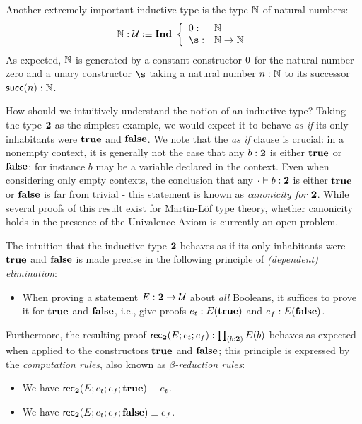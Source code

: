 Another extremely important inductive type is the type $\mathbb{N}$ of natural numbers:  
\[  \nat : \type \defeq \myInd \left\{ 
\begin{array}{ll}
\z : & \nat \\
\s : & \nat \to \nat
\end{array}
\right. \]
As expected, $\mathbb{N}$ is generated by a constant constructor $0$ for the natural number zero and a unary constructor $\s$ taking a natural number $n : \mathbb{N}$ to its successor $\mathsf{succ}(n) : \mathbb{N}$. 

How should we intuitively understand the notion of an inductive type? Taking the type ${\mathbf{2}}$ as the simplest example, we would expect it to behave \emph{as if} its only inhabitants were $\mathbf{true}$ and $\mathbf{false}$. We note that the \emph{as if} clause is crucial: in a nonempty context, it is generally not the case that any $b : {\mathbf{2}}$ is either $\mathbf{true}$ or $\mathbf{false}$; for instance $b$ may be a variable declared in the context. Even when considering only empty contexts, the conclusion that any $\cdot \vdash b : {\mathbf{2}}$ is either $\mathbf{true}$ or $\mathbf{false}$ is far from trivial - this statement is known as \emph{canonicity for ${\mathbf{2}}$}. While several proofs of this result exist for Martin-L{\"o}f type theory, whether canonicity holds in the presence of the Univalence Axiom is currently an open problem.

The intuition that the inductive type ${\mathbf{2}}$ behaves as if its only inhabitants were $\mathbf{true}$ and $\mathbf{false}$ is made precise in the following principle of \emph{(dependent) elimination}:

\begin{itemize}
\item When proving a statement $E : {\mathbf{2}} \to \mathcal{U}$ about \emph{all} Booleans, it suffices to prove it for $\mathbf{true}$ and $\mathbf{false}$, i.e., give proofs
$ e_t : E(\mathbf{true})$ and $e_f : E(\mathbf{false})$.
\end{itemize}

Furthermore, the resulting proof $\rec\two(E;e_t;e_f): \prd{b : \two}E(b)$ behaves as expected when applied to the constructors $\mathbf{true}$ and $\mathbf{false}$; this principle is expressed by the \emph{computation rules}, also known as \emph{$\beta$-reduction rules}:
\begin{itemize}
\item We have $\mathsf{rec}_{{\mathbf{2}}}(E;e_t;e_f;\mathbf{true}) \equiv e_t$.
\item We have $\mathsf{rec}_{{\mathbf{2}}}(E;e_t;e_f;\mathbf{false}) \equiv e_f$.
\end{itemize}

